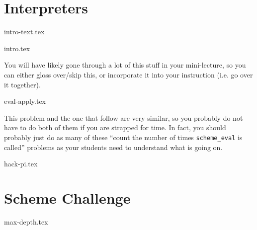 \documentclass{exam}
\begin{document}
\section{Interpreters}
{intro-text.tex}
\begin{questions}
    {intro.tex}

    \begin{meta}
        You will have likely gone through a lot of this stuff in your mini-lecture, so you
        can either gloss over/skip this, or incorporate it into your instruction (i.e. go
        over it together).
    \end{meta}

    {eval-apply.tex}

    \begin{questionmeta}
        This problem and the one that follow are very similar, so you probably do not have to 
        do both of them if you are strapped for time. In fact, you should probably just do as many of these
        ``count the number of times \lstinline{scheme_eval} is called'' problems as your students need
        to understand what is going on. 
    \end{questionmeta}
    
    {hack-pi.tex}
\end{questions}

\section{Scheme Challenge}
\begin{questions}
{max-depth.tex}
\end{questions}
\end{document}
